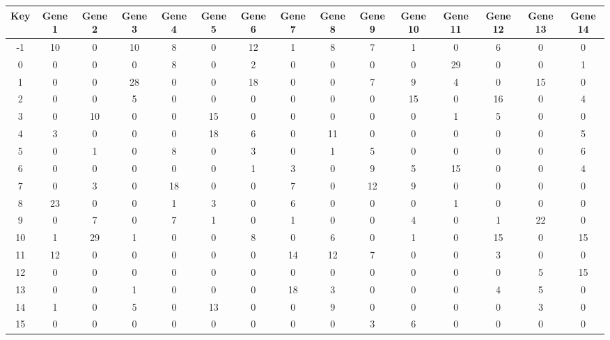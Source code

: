 \begin{tabular}{|c|c|c|c|c|c|c|c|c|c|c|c|c|c|c|}
\hline
Key & Gene 1 & Gene 2 & Gene 3 & Gene 4 & Gene 5 & Gene 6 & Gene 7 & Gene 8 & Gene 9 & Gene 10 & Gene 11 & Gene 12 & Gene 13 & Gene 14 \\
\hline
-1 & 10 & 0 & 10 & 8 & 0 & 12 & 1 & 8 & 7 & 1 & 0 & 6 & 0 & 0 \\
0 & 0 & 0 & 0 & 8 & 0 & 2 & 0 & 0 & 0 & 0 & 29 & 0 & 0 & 1 \\
1 & 0 & 0 & 28 & 0 & 0 & 18 & 0 & 0 & 7 & 9 & 4 & 0 & 15 & 0 \\
2 & 0 & 0 & 5 & 0 & 0 & 0 & 0 & 0 & 0 & 15 & 0 & 16 & 0 & 4 \\
3 & 0 & 10 & 0 & 0 & 15 & 0 & 0 & 0 & 0 & 0 & 1 & 5 & 0 & 0 \\
4 & 3 & 0 & 0 & 0 & 18 & 6 & 0 & 11 & 0 & 0 & 0 & 0 & 0 & 5 \\
5 & 0 & 1 & 0 & 8 & 0 & 3 & 0 & 1 & 5 & 0 & 0 & 0 & 0 & 6 \\
6 & 0 & 0 & 0 & 0 & 0 & 1 & 3 & 0 & 9 & 5 & 15 & 0 & 0 & 4 \\
7 & 0 & 3 & 0 & 18 & 0 & 0 & 7 & 0 & 12 & 9 & 0 & 0 & 0 & 0 \\
8 & 23 & 0 & 0 & 1 & 3 & 0 & 6 & 0 & 0 & 0 & 1 & 0 & 0 & 0 \\
9 & 0 & 7 & 0 & 7 & 1 & 0 & 1 & 0 & 0 & 4 & 0 & 1 & 22 & 0 \\
10 & 1 & 29 & 1 & 0 & 0 & 8 & 0 & 6 & 0 & 1 & 0 & 15 & 0 & 15 \\
11 & 12 & 0 & 0 & 0 & 0 & 0 & 14 & 12 & 7 & 0 & 0 & 3 & 0 & 0 \\
12 & 0 & 0 & 0 & 0 & 0 & 0 & 0 & 0 & 0 & 0 & 0 & 0 & 5 & 15 \\
13 & 0 & 0 & 1 & 0 & 0 & 0 & 18 & 3 & 0 & 0 & 0 & 4 & 5 & 0 \\
14 & 1 & 0 & 5 & 0 & 13 & 0 & 0 & 9 & 0 & 0 & 0 & 0 & 3 & 0 \\
15 & 0 & 0 & 0 & 0 & 0 & 0 & 0 & 0 & 3 & 6 & 0 & 0 & 0 & 0 \\
\hline
\end{tabular}
